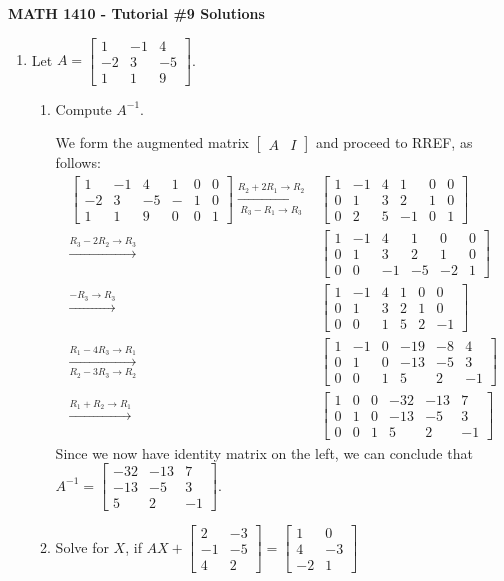 \documentclass[12pt]{article}
\newcommand{\bbm}{\begin{bmatrix}}
\newcommand{\ebm}{\end{bmatrix}}
\newcommand{\binv}{\left[\begin{array}{ccc|ccc}}
\newcommand{\einv}{\end{array}\right]}
\begin{document}
\author{Instructor: Sean Fitzpatrick}
\thispagestyle{empty}
\begin{center}
{\bf MATH 1410 - Tutorial \#9 Solutions}
\end{center}





 \begin{enumerate}
\item Let $A=\bbm 1&-1&4\\-2&3&-5\\1&1&9\ebm$.
\begin{enumerate}
\item Compute $A^{-1}$.

We form the augmented matrix $\bbm A&I\ebm$ and proceed to RREF, as follows:
\begin{align*}
\binv 1&-1&4&1&0&0\\
     -2&3&-5&-&1&0\\
      1&1& 9&0&0&1\einv \xrightarrow[R_3-R_1\to R_3]{R_2+2R_1\to R_2}&
\binv 1&-1&4&1&0&0\\
      0&1&3&2&1&0\\
      0&2&5&-1&0&1\einv\\ \xrightarrow{R_3-2R_2\to R_3}&
\binv 1&-1&4&1&0&0\\
      0&1&3&2&1&0\\
      0&0&-1&-5&-2&1\einv\\ \xrightarrow{-R_3\to R_3}&
\binv 1&-1&4&1&0&0\\
      0&1&3&2&1&0\\
      0&0&1&5&2&-1\einv\\ \xrightarrow[R_2-3R_3\to R_2]{R_1-4R_3\to R_1}&
\binv 1&-1&0&-19&-8&4\\
      0&1&0&-13&-5&3\\
      0&0&1&5&2&-1\einv\\ \xrightarrow{R_1+R_2\to R_1}&
\binv 1&0&0&-32&-13&7\\
      0&1&0&-13&-5&3\\
      0&0&1&5&2&-1\einv      
\end{align*}
Since we now have identity matrix on the left, we can conclude that $A^{-1} = \bbm -32 &-13&7\\-13&-5&3\\5&2&-1\ebm$.

\item Solve for $X$, if $AX+\bbm 2&-3\\-1&-5\\4&2\ebm = \bbm 1&0\\4&-3\\-2&1\ebm$


\end{enumerate}
\end{enumerate}
\end{document}
